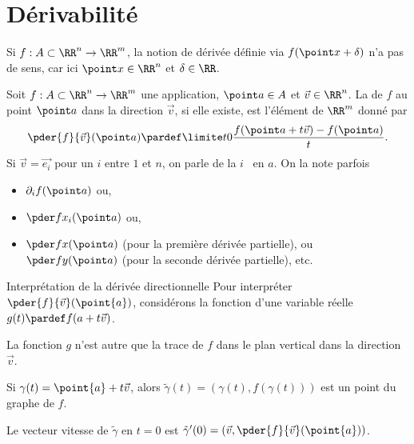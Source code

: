 \section{Dérivabilité}
\begin{frame}
  \begin{remark*}
    Si \(f : A \subset \RR^{n} \to \RR^{m}\), la notion de dérivée définie via \(f(\point x + \delta)\) n'a pas de sens, car\pause{} ici \(\point x \in \RR^{n}\) et \(\delta \in \RR\).
  \end{remark*}\pause{}

  \begin{definition}
    Soit \(f : A \subset \RR^{n} \to \RR^{m}\) une application, \(\point a \in A\) et \(\vec v \in \RR^{n}\).\pause{} La  de \(f\) au point \(\point a\) dans la direction \(\vec v\), si elle existe, est l'élément de \(\RR^m\) donné par\pause{}
    \begin{equation*}
      \pder{f}{\vec v}(\point a) \pardef \limite t 0 \frac{f(\point a + t \vec v) - f(\point a)}{t}.
    \end{equation*}\pause
    Si \(\vec v = \vec{e_{i}}\) pour un \(i\) entre \(1\) et \(n\), on parle de la \(i\)\ieme~ en \(a\).\pause{} On la note parfois
    \begin{itemize}
    \item \(\partial_{i}f(\point a)\) ou,\pause{}
    \item\(\pder f{x_{i}}(\point a)\) ou,\pause{}
    \item \(\pder f{x}(\point a)\) (pour la première dérivée partielle),\pause{} ou \(\pder f{y}(\point a)\) (pour la seconde dérivée partielle), etc.
    \end{itemize}
  \end{definition}
\end{frame}
\begin{frame}{Interprétation de la dérivée directionnelle}
  Pour interpréter \(\pder{f}{\vec{v}}(\point{a})\),\pause{} considérons la fonction d'une variable réelle \(g(t) \pardef f(a+t\vec v)\).\pause{}

  La fonction \(g\) n'est autre que la trace de \(f\) dans le plan vertical dans la direction \(\vec{v}\).\pause{}

  Si \(\gamma(t) = \point{a} + t \vec{v}\),\pause{} alors \(\tilde\gamma(t) = (\gamma(t),f(\gamma(t)))\) est un point du graphe de \(f\).\pause{}

  Le vecteur vitesse de \(\tilde\gamma\) en \(t = 0\) est\pause{} \(\tilde\gamma'(0) = (\vec{v}, \pder{f}{\vec v}(\point{a}))\).
\end{frame}
